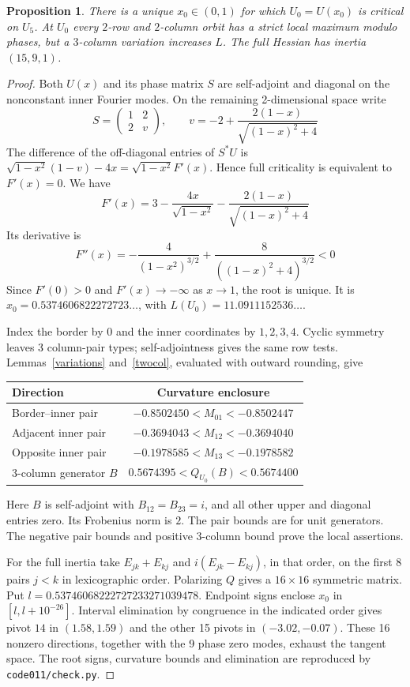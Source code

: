\documentclass[11pt,a4paper]{article}
\newtheorem{prop}[thm]{Proposition}
\begin{document}
\begin{prop}\label{fivecalibration}
There is a unique $x_0\in(0,1)$ for which $U_0=U(x_0)$ is critical on
$U_5$. At $U_0$ every $2$-row and $2$-column orbit has a strict local
maximum modulo phases, but a $3$-column variation increases $L$.
The full Hessian has inertia $(15,9,1)$.
\end{prop}
\begin{proof}
Both $U(x)$ and its phase matrix $S$ are self-adjoint and diagonal on the
nonconstant inner Fourier modes. On the remaining 2-dimensional
space write
\[
 S=\begin{pmatrix}1&2\\2&v\end{pmatrix},\qquad
 v=-2+\frac{2(1-x)}{\sqrt{(1-x)^2+4}}
\]
The difference of the off-diagonal entries of $S^*U$ is
$\sqrt{1-x^2}(1-v)-4x=\sqrt{1-x^2}F'(x)$. Hence full criticality is
equivalent to $F'(x)=0$. We have
\[
 F'(x)=3-\frac{4x}{\sqrt{1-x^2}}-
                 \frac{2(1-x)}{\sqrt{(1-x)^2+4}}
\]
Its derivative is
\[
 F''(x)=-\frac4{(1-x^2)^{3/2}}
             +\frac8{((1-x)^2+4)^{3/2}}<0
\]
Since $F'(0)>0$ and $F'(x)\to-\infty$ as $x\to1$, the root is unique.
It is $x_0=0.5374606822272723\ldots$, with $L(U_0)=11.0911152536\ldots$.

Index the border by $0$ and the inner coordinates by $1,2,3,4$.
Cyclic symmetry leaves 3 column-pair types; self-adjointness gives the
same row tests. Lemmas~\ref{variations} and~\ref{twocol}, evaluated with
outward rounding, give
\begin{center}
\begin{tabular}{lc}
\toprule
Direction & Curvature enclosure\\
\midrule
Border--inner pair & $-0.8502450<M_{01}<-0.8502447$\\
Adjacent inner pair & $-0.3694043<M_{12}<-0.3694040$\\
Opposite inner pair & $-0.1978585<M_{13}<-0.1978582$\\
3-column generator $B$ & $0.5674395<Q_{U_0}(B)<0.5674400$\\
\bottomrule
\end{tabular}
\end{center}
Here $B$ is self-adjoint with $B_{12}=B_{23}=i$, and all other upper and
diagonal entries zero. Its Frobenius norm is $2$. The pair bounds are
for unit generators. The negative pair bounds and positive 3-column
bound prove the local assertions.

For the full inertia take $E_{jk}+E_{kj}$ and $i(E_{jk}-E_{kj})$,
in that order, on the first 8 pairs $j<k$ in lexicographic order. Polarizing $Q$
gives a $16\times16$ symmetric matrix. Put
$l=0.53746068222727233271039478$. Endpoint signs enclose $x_0$ in
$[l,l+10^{-26}]$. Interval elimination by congruence in the indicated
order gives pivot $14$ in $(1.58,1.59)$ and the other 15 pivots in
$(-3.02,-0.07)$. These 16 nonzero directions, together with the
9 phase zero modes, exhaust the tangent space. The root signs,
curvature bounds and elimination are reproduced by \texttt{code011/check.py}.
\end{proof}
\end{document}
